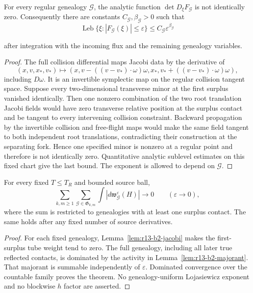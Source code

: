 \begin{lemma}
\label{lem:r13-b2-jacobi}
For every regular genealogy $\mathcal G$, the analytic function
$\det D_\xi F_{\mathcal G}$ is not identically zero.  Consequently there are
constants $C_{\mathcal G},\beta_{\mathcal G}>0$ such that
\[
 \operatorname{Leb}\{\xi:
   |F_{\mathcal G}(\xi)|\le\varepsilon\}
 \le C_{\mathcal G}\varepsilon^{\beta_{\mathcal G}}
\]

after integration with the incoming flux and the remaining genealogy
variables.
\end{lemma}

\begin{proof}
The full collision differential maps Jacobi data by the derivative of
\[
 (x,v,x_*,v_*)\mapsto
 (x,v-((v-v_*)\cdot\omega)\omega,
  x_*,v_*+((v-v_*)\cdot\omega)\omega),
\]
including $D\omega$.  It is an invertible symplectic map on the regular
collision tangent space.  Suppose every two-dimensional transverse minor at
the first surplus vanished identically.  Then one nonzero combination of the
two root translation Jacobi fields would have zero transverse relative
position at the surplus contact and be tangent to every intervening collision
constraint.  Backward propagation by the invertible collision and free-flight
maps would make the same field tangent to both independent root translations,
contradicting their construction at the separating fork.  Hence one specified
minor is nonzero at a regular point and therefore is not identically zero.
Quantitative analytic sublevel estimates on this fixed chart give the last
bound.  The exponent is allowed to depend on $\mathcal G$.
\end{proof}

\begin{theorem}
\label{thm:r13-b2-cycles}
For every fixed $T\le T_R$ and bounded source ball,
\[
 \sum_{k,m\ge1}
 \sum_{\mathcal G\in\mathfrak G_{k,m}}
 \int|d\mathfrak w_{\mathcal G}^\varepsilon(H)|
 \longrightarrow0
 \qquad(\varepsilon\to0),
\]
where the sum is restricted to genealogies with at least one surplus contact.
The same holds after any fixed number of source derivatives.
\end{theorem}

\begin{proof}
For each fixed genealogy,
Lemma~\ref{lem:r13-b2-jacobi} makes the first-surplus tube weight tend to zero.
The full genealogy, including all later true reflected contacts, is dominated
by the activity in Lemma~\ref{lem:r13-b2-majorant}.  That majorant is summable
independently of $\varepsilon$.  Dominated convergence over the countable
family proves the theorem.  No genealogy-uniform Lojasiewicz exponent and no
blockwise $h$ factor are asserted.
\end{proof}

